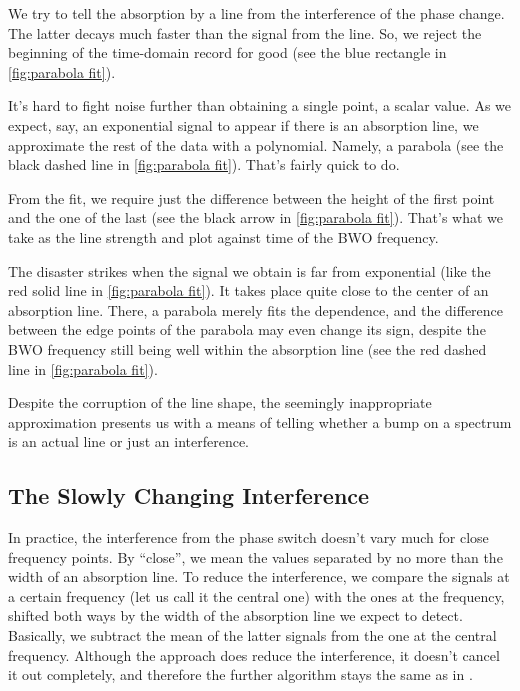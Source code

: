 \documentclass[a4paper]{article}
\begin{document}
We try to tell the absorption by a line from the interference of the phase change. The latter decays much faster than the signal from the line. So, we reject the beginning of the time-domain record for good (see the blue rectangle in \cref{fig:parabola fit}).

It's hard to fight noise further than obtaining a single point, a scalar value. As we expect, say, an exponential signal to appear if there is an absorption line, we approximate the rest of the data with a polynomial. Namely, a parabola (see the black dashed line in \cref{fig:parabola fit}). That's fairly quick to do.

From the fit, we require just the difference between the height of the first point and the one of the last (see the black arrow in \cref{fig:parabola fit}). That's what we take as the line strength and plot against time of the BWO frequency.

The disaster strikes when the signal we obtain is far from exponential (like the red solid line in \cref{fig:parabola fit}). It takes place quite close to the center of an absorption line. There, a parabola merely fits the dependence, and the difference between the edge points of the parabola may even change its sign, despite the BWO frequency still being well within the absorption line (see the red dashed line in \cref{fig:parabola fit}).

Despite the corruption of the line shape, the seemingly inappropriate approximation presents us with a means of telling whether a bump on a spectrum is an actual line or just an interference.

\subsection{The Slowly Changing Interference}\label{subsec:The Slowly Changing Interference}

In practice, the interference from the phase switch doesn't vary much for close frequency points. By \enquote{close}, we mean the values separated by no more than the width of an absorption line. To reduce the interference, we compare the signals at a certain frequency (let us call it the central one) with the ones at the frequency, shifted both ways by the width of the absorption line we expect to detect. Basically, we subtract the mean of the latter signals from the one at the central frequency. Although the approach does reduce the interference, it doesn't cancel it out completely, and therefore the further algorithm stays the same as in .
\end{document}
